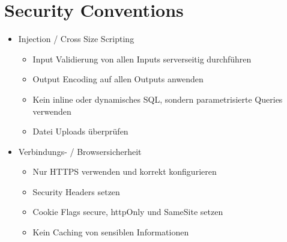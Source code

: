 \section{Security Conventions}
\begin{itemize}
    \item{Injection / Cross Size Scripting}
    \begin{itemize}
        \item{Input Validierung von allen Inputs serverseitig durchführen}
        \item{Output Encoding auf allen Outputs anwenden}
        \item{Kein inline oder dynamisches SQL, sondern parametrisierte Queries verwenden}
        \item {Datei Uploads überprüfen}
    \end{itemize}
    \item Verbindungs- / Browsersicherheit
    \begin{itemize}
        \item{Nur HTTPS verwenden und korrekt konfigurieren}
        \item{Security Headers setzen}
        \item{Cookie Flags secure, httpOnly und SameSite setzen}
        \item{Kein Caching von sensiblen Informationen}
    \end{itemize}


\end{itemize}
